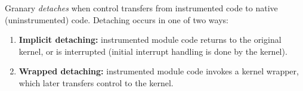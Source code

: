 \documentclass[preprint]{sigplanconf}
\begin{document}

Granary \emph{detaches} when control transfers from instrumented code to native (uninstrumented) code. Detaching occurs in one of two ways: \begin{enumerate}
	\item {\bf Implicit detaching:} instrumented module code returns to the original kernel, or is interrupted (initial interrupt handling is done by the kernel).
	\item {\bf Wrapped detaching:} instrumented module code invokes a kernel wrapper, which later transfers control to the kernel.
\end{enumerate}





\end{document}
